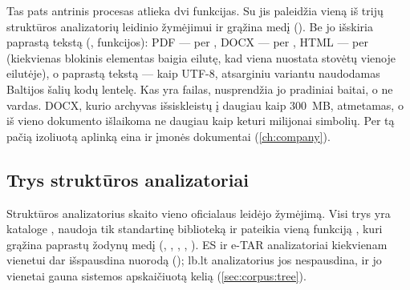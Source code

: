 Tas pats antrinis procesas atlieka dvi funkcijas. Su  jis paleidžia vieną iš
trijų struktūros analizatorių leidinio žymėjimui ir grąžina medį
(). Be jo išskiria paprastą tekstą
(,  funkcijos): PDF --- per
, DOCX --- per , HTML --- per  (kiekvienas blokinis
elementas baigia eilutę, kad viena nuostata stovėtų vienoje eilutėje), o paprastą tekstą ---
kaip UTF-8, atsarginiu variantu naudodamas Baltijos šalių kodų lentelę. Kas yra failas,
nusprendžia jo pradiniai baitai, o ne vardas. DOCX, kurio archyvas išsiskleistų į daugiau kaip
300~MB, atmetamas, o iš vieno dokumento išlaikoma ne daugiau kaip keturi milijonai simbolių. Per
tą pačią izoliuotą aplinką eina ir įmonės dokumentai (\cref{ch:company}).

\subsection{Trys struktūros analizatoriai}\label{sec:corpus:parsers}

Struktūros analizatorius skaito vieno oficialaus leidėjo žymėjimą. Visi trys yra kataloge
, naudoja tik standartinę biblioteką ir pateikia vieną funkciją
, kuri grąžina paprastų žodynų medį (, ,
, , ). ES ir e-TAR analizatoriai kiekvienam vienetui
dar išspausdina nuorodą (); lb.lt analizatorius jos nespausdina, ir jo vienetai gauna
sistemos apskaičiuotą kelią (\cref{sec:corpus:tree}).

